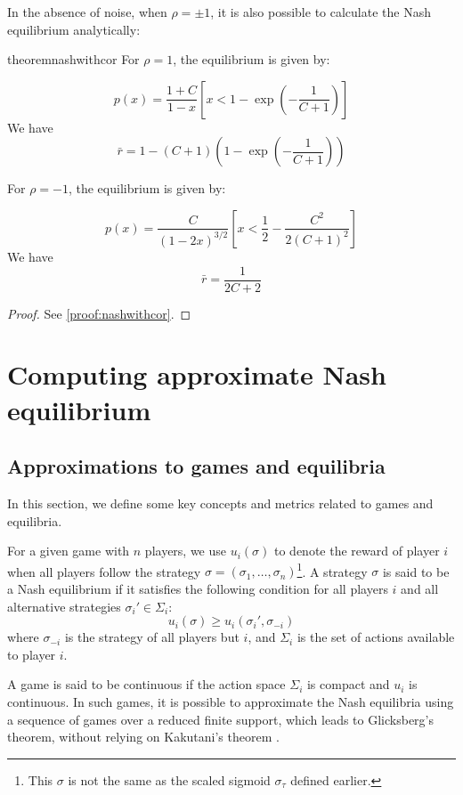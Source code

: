 \documentclass[preprint,12pt,authoryear,doubleblind]{elsarticle}
\theoremstyle{definition}
\begin{document}
In the absence of noise, when $\rho = \pm 1$, it is also possible to calculate the Nash equilibrium analytically:

\begin{restatable}{theorem}{nashwithcor}
\label{thm:nashwithcor}
        For $\rho = 1$, the equilibrium is given by:

    $$p(x) = \frac{1+C}{1-x} \left[x < 1 - \exp\left(-\frac{1}{C+1}\right)\right]$$ 
    We have $$\bar r = 1 - (C+1)\left(1-\exp\left(-\frac{1}{C+1}\right)\right)$$

    For $\rho = -1$, the equilibrium is given by:

    $$p(x) = \frac{C}{(1-2x)^{3/2}} \left[x < \frac{1}{2} - \frac{C^2}{2(C+1)^2}\right]$$
    We have  $$\bar r = \frac{1}{2C+2}$$

    
\end{restatable}
\begin{proof}
    See \ref{proof:nashwithcor}.    
\end{proof}
\section{Computing approximate Nash equilibrium}

\subsection{Approximations to games and equilibria}
\label{sec:approx}

In this section, we define some key concepts and metrics related to games and equilibria. 

For a given game with $n$ players, we use $u_i(\sigma)$ to denote the reward of player $i$ when all players follow the strategy $\sigma = (\sigma_1, \ldots, \sigma_n)$\footnote{This $\sigma$ is not the same as the scaled sigmoid $\sigma_\tau$ defined earlier.}. A strategy $\sigma$ is said to be a Nash equilibrium if it satisfies the following condition for all players $i$ and all alternative strategies $\sigma_i' \in \Sigma_i$: 
$$u_i(\sigma) \ge u_i(\sigma_i', \sigma_{-i})$$ 
where $\sigma_{-i}$ is the strategy of all players but $i$, and $\Sigma_i$ is the set of actions available to player $i$. 

A game is said to be continuous if the action space $\Sigma_i$ is compact and $u_i$ is continuous. In such games, it is possible to approximate the Nash equilibria using a sequence of games over a reduced finite support, which leads to Glicksberg’s theorem, without relying on Kakutani’s theorem \citep{myerson1997game}. 
\end{document}
